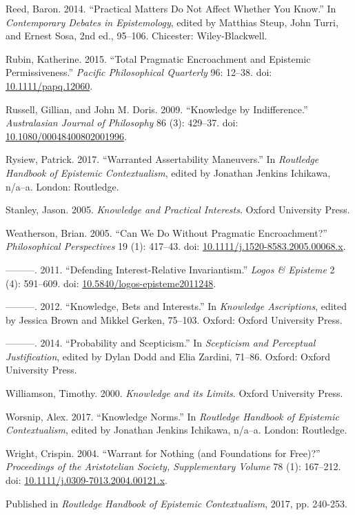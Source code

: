 \documentclass[
  10pt,
  letterpaper,
  DIV=11,
  numbers=noendperiod,
  twoside]{scrartcl}
\newlength{\cslhangindent}
\newenvironment{CSLReferences}[2] %
 {\begin{list}{}{%
  \setlength{\itemindent}{0pt}
  \setlength{\leftmargin}{0pt}
  \setlength{\parsep}{0pt}
  \ifodd #1
   \setlength{\leftmargin}{\cslhangindent}
   \setlength{\itemindent}{-1\cslhangindent}
  \fi
  \setlength{\itemsep}{#2\baselineskip}}}
 {\end{list}}
\begin{document}
\begin{CSLReferences}{1}{0}
Reed, Baron. 2014. {``Practical Matters Do Not Affect Whether You
Know.''} In \emph{Contemporary Debates in Epistemology}, edited by
Matthias Steup, John Turri, and Ernest Sosa, 2nd ed., 95--106.
Chicester: Wiley-Blackwell.

Rubin, Katherine. 2015. {``Total Pragmatic Encroachment and Epistemic
Permissiveness.''} \emph{Pacific Philosophical Quarterly} 96: 12--38.
doi: \href{https://doi.org/10.1111/papq.12060}{10.1111/papq.12060}.

Russell, Gillian, and John M. Doris. 2009. {``Knowledge by
Indifference.''} \emph{Australasian Journal of Philosophy} 86 (3):
429--37. doi:
\href{https://doi.org/10.1080/00048400802001996}{10.1080/00048400802001996}.

Rysiew, Patrick. 2017. {``Warranted Assertability Maneuvers.''} In
\emph{Routledge Handbook of Epistemic Contextualism}, edited by Jonathan
Jenkins Ichikawa, n/a--a. London: Routledge.

Stanley, Jason. 2005. \emph{{Knowledge and Practical Interests}}. Oxford
University Press.

Weatherson, Brian. 2005. {``{Can We Do Without Pragmatic
Encroachment?}''} \emph{Philosophical Perspectives} 19 (1): 417--43.
doi:
\href{https://doi.org/10.1111/j.1520-8583.2005.00068.x}{10.1111/j.1520-8583.2005.00068.x}.

---------. 2011. {``Defending Interest-Relative Invariantism.''}
\emph{Logos \& Episteme} 2 (4): 591--609. doi:
\href{https://doi.org/10.5840/logos-episteme2011248}{10.5840/logos-episteme2011248}.

---------. 2012. {``Knowledge, Bets and Interests.''} In \emph{Knowledge
Ascriptions}, edited by Jessica Brown and Mikkel Gerken, 75--103.
Oxford: Oxford University Press.

---------. 2014. {``Probability and Scepticism.''} In \emph{Scepticism
and Perceptual Justification}, edited by Dylan Dodd and Elia Zardini,
71--86. Oxford: Oxford University Press.

Williamson, Timothy. 2000. \emph{{Knowledge and its Limits}}. Oxford
University Press.

Worsnip, Alex. 2017. {``Knowledge Norms.''} In \emph{Routledge Handbook
of Epistemic Contextualism}, edited by Jonathan Jenkins Ichikawa,
n/a--a. London: Routledge.

Wright, Crispin. 2004. {``Warrant for Nothing (and Foundations for
Free)?''} \emph{Proceedings of the Aristotelian Society, Supplementary
Volume} 78 (1): 167--212. doi:
\href{https://doi.org/10.1111/j.0309-7013.2004.00121.x}{10.1111/j.0309-7013.2004.00121.x}.

\end{CSLReferences}



\noindent Published in\emph{
Routledge Handbook of Epistemic Contextualism}, 2017, pp. 240-253.
\end{document}
